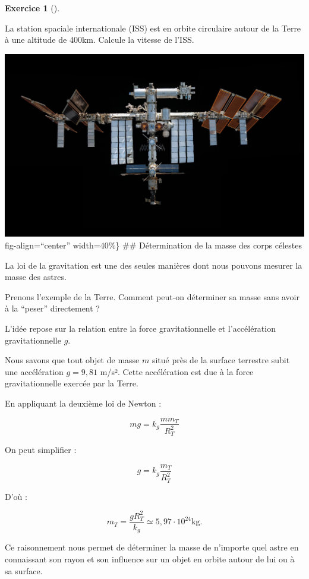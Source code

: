 \documentclass[
  letterpaper,
  DIV=11,
  numbers=noendperiod]{scrartcl}
\theoremstyle{definition}
\newtheorem{exercise}{Exercice}[section]
\theoremstyle{definition}
\theoremstyle{definition}
\theoremstyle{remark}
\begin{document}
\begin{exercise}[]\protect\hypertarget{exr-iss}{}\label{exr-iss}

La station spaciale internationale (ISS) est en orbite circulaire autour
de la Terre à une altitude de 400km. Calcule la vitesse de l'ISS.

\end{exercise}

\includegraphics{figures/grav/iss.pdf}fig-align=``center'' width=40\%\}
\#\# Détermination de la masse des corps célestes

La loi de la gravitation est une des seules manières dont nous pouvons
mesurer la masse des astres.

Prenons l'exemple de la Terre. Comment peut-on déterminer sa masse sans
avoir à la ``peser'' directement ?

L'idée repose sur la relation entre la force gravitationnelle et
l'accélération gravitationnelle \(g\).

Nous savons que tout objet de masse \(m\) situé près de la surface
terrestre subit une accélération \(g = 9,81\) m/s². Cette accélération
est due à la force gravitationnelle exercée par la Terre.

En appliquant la deuxième loi de Newton :

\[
m g =  k_g\frac{m m_T}{R_T^2}
\]

On peut simplifier :

\[
g = k_g\frac{ m_T}{R_T^2}
\]

D'où :

\[
m_T = \frac{g R_T^2}{k_g}\simeq 5,97\cdot 10^{24}\text{kg}.
\]

Ce raisonnement nous permet de déterminer la masse de n'importe quel
astre en connaissant son rayon et son influence sur un objet en orbite
autour de lui ou à sa surface.
\end{document}
